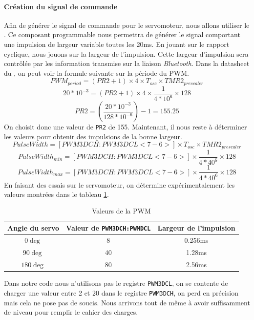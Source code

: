 				\paragraph{Création du signal de commande} Afin de générer le signal de commande pour le servomoteur, nous allons utiliser le \pic. Ce composant programmable nous permettra de générer le signal comportant une impulsion de largeur variable toutes les 20ms. En jouant sur le rapport cyclique, nous jouons sur la largeur de l'impulsion. Cette largeur d'impulsion sera contrôlée par les information transmise sur la liaison \textit{Bluetooth}. Dans la datasheet du \pic \cite{DatasheetPIC}, on peut voir la formule suivante sur la période du PWM.
				$$ PWM_{period}=(PR2+1)\times 4 \times T_{osc} \times TMR2_{prescaler}$$
				$$ 20*10^{-3}=(PR2+1) \times 4 \times \frac{1}{4*10^{6}} \times 128$$
				$$ PR2=\left(\frac{20*10^{-3}}{128*10^{-6}} \right)-1=155.25$$
				On choisit donc une valeur de \texttt{PR2} de 155. Maintenant, il nous reste à déterminer les valeurs pour obtenir des impulsions de la bonne largeur.
				$$ PulseWidth=[PWM3DCH:PWM3DCL<7-6>]\times T_{osc} \times TMR2_{prescaler}$$
				$$ PulseWidth_{min}=[PWM3DCH:PWM3DCL<7-6>]\times \frac{1}{4*40^{6}} \times 128$$
				$$ PulseWidth_{max}=[PWM3DCH:PWM3DCL<7-6>]\times \frac{1}{4*40^{6}} \times 128$$
				En faisant des essais sur le servomoteur, on détermine expérimentalement les valeurs montrées dans le tableau \ref{PWMval}.
				\begin{table}[h]
				\begin{center}
					\begin{tabular}{c|c|c}
					
					Angle du servo & Valeur de \texttt{PWM3DCH:PWMDCL} & Largeur de l'impulsion \\ 
					\hline 
					$0\deg$ & 8 & 0.256ms \\
					$90\deg$ & 40 & 1.28ms \\
					$180\deg$ & 80 & 2.56ms \\ 
					
					\end{tabular} 
					\caption{Valeurs de la PWM}
					\label{PWMval}
				\end{center}
				\end{table}
				Dans notre code nous n'utilisons pas le registre \texttt{PWM3DCL}, on se contente de charger une valeur entre 2 et 20 dans le registre \texttt{PWM3DCH}, on perd en précision mais cela ne pose pas de soucis. Nous arrivons tout de même à avoir suffisamment de niveau pour remplir le cahier des charges.
